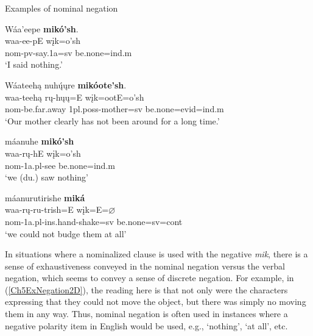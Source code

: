 \begin{exe}
    \item\label{Ch5ExNegation2} Examples of nominal negation

    \begin{xlist}
            \item\label{Ch5ExNegation2A} \glll Wáa'eepe \textbf{mikó'sh}.\\
            waa-ee-pE wįk=o'sh\\
            nom-pv-\textnormal{say}.1a=sv \textnormal{be.none}=ind.m\\
            \glt `I said nothing.' \citep[41]{hollow1973a}

        \item\label{Ch5ExNegation2B} \glll Wáateehą nuhų́ųre \textbf{mikóote'sh}.\\
        waa-teehą rų-hųų=E wįk=ootE=o'sh\\
        nom-\textnormal{be.far.away} 1pl.poss-\textnormal{mother}=sv \textnormal{be.none}=evid=ind.m\\
        \glt `Our mother clearly has not been around for a long time.' \citep[145]{hollow1973a}

        \item\label{Ch5ExNegation2C} \glll máanuhe \textbf{mikó'sh}\\
        waa-rų-hE wįk=o'sh\\
        nom-1a.pl-\textnormal{see} \textnormal{be.none}=ind.m\\
        \glt `we (du.) saw nothing' \citep[186]{hollow1973b}

        \item\label{Ch5ExNegation2D} \glll máanurutirishe \textbf{miká}\\
        waa-rų-ru-trish=E wįk=E=$\varnothing$\\
        nom-1a.pl-ins.hand-\textnormal{shake}=sv \textnormal{be.none}=sv=cont\\
        \glt `we could not budge them at all' \citep[52]{hollow1973a}

        
        
    \end{xlist}
\end{exe}

In situations where a nominalized clause is used with the negative \textit{mik}, there is a sense of exhaustiveness conveyed in the nominal negation versus the verbal negation, which seems to convey a sense of discrete negation. For example, in (\ref{Ch5ExNegation2D}), the reading here is that not only were the characters expressing that they could not move the object, but there was simply no moving them in any way. Thus, nominal negation is often used in instances where a negative polarity item in English would be used, e.g., `nothing', `at all', etc.


